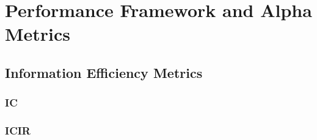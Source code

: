 \section{Performance Framework and Alpha Metrics}
\subsection{Information Efficiency Metrics}
\subsubsection*{\acf{IC}}
\subsubsection*{\acf{ICIR}}
